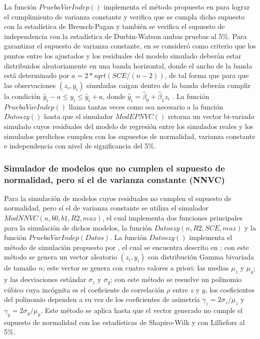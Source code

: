 La función $PruebaVarIndep()$ implementa el método propuesto en \textcite{febles-2014} para lograr el cumplimiento de varianza constante y verifica que se cumpla dicho supuesto con la estadística de Breusch-Pagan y también se verifica el supuesto de independencia con la estadística de Durbin-Watson ambas pruebas al 5\%. Para garantizar el supuesto de varianza constante, en \textcite{febles-2014} se consideró como criterio que los puntos entre los ajustados y los residuales del modelo simulado deberán estar distribuidos aleatoriamente en una banda horizontal, donde el ancho de la banda está determinado por $a=2*sqrt(SCE/(n-2))$, de tal forma que para que las observaciones $(z_i, y_i)$ simuladas caigan dentro de la banda deberán cumplir la condición $\hat{y}_i - a \leq y_i \leq \hat{y}_i + a $, donde $\hat{y}_i=\hat{\beta}_0+\hat{\beta}_1 z_i$ . La función $PruebaVarIndep()$ llama tantas veces como sea necesario a la función $Datoszy()$ hasta que el simulador $ModEPNVC()$  retorna un vector bi-variado simulado cuyos residuales del modelo de regresión entre los simulados reales y los simulados predichos cumplen con los supuestos de normalidad, varianza constante e independencia con nivel de significancia del 5\%.\\ 

\subsubsection{Simulador de modelos que no cumplen el supuesto de normalidad, pero sí el de varianza constante (NNVC)}


Para la simulación de modelos cuyos residuales no cumplen el supuesto de normalidad, pero sí el de varianza constante se utiliza el simulador $ModNNVC(n,b0,b1,R2,muz)$, el cual implementa dos funciones principales para la simulación de dichos modelos, la función $Datoszy(n,R2,SCE,muz)$ y la función $PruebaVarIndep(Datos)$. La función $Datoszy()$ implementa el método de simulación propuesto por \textcite{cheng-2011} , el cual se encuentra descrito en \textcite{febles-2014}; con este método se genera un vector aleatorio $(z_i, y_i)$ con distribución Gamma bivariada de tamaño $n$; este vector se genera con cuatro valores a priori: las medias $\mu_z$ y $\mu_y$; y las desviaciones estándar $\sigma_z$ y $\sigma_y$; con este método se resuelve un polinomio cúbico cuya incógnita es el coeficiente de correlación $\rho$ entre $z$ y $y$, los coeficientes del polinomio dependen a su vez de los coeficientes de asimetría $\gamma_z=2\sigma_z/ \mu_z$ y $\gamma_y=2\sigma_y/ \mu_y$. Este método se aplica hasta que el vector generado no cumple el supuesto de normalidad con las estadísticas de Shapiro-Wilk y con Lilliefors al 5\%.\\


